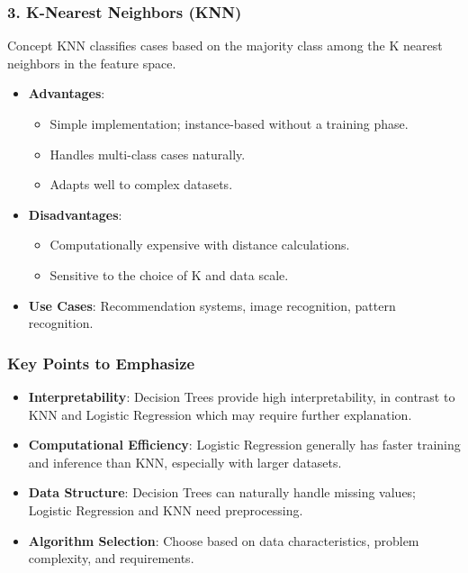 \documentclass[aspectratio=169]{beamer}
\begin{document}
\begin{frame}[fragile]
    \frametitle{3. K-Nearest Neighbors (KNN)}
    \begin{block}{Concept}
        KNN classifies cases based on the majority class among the K nearest neighbors in the feature space.
    \end{block}
    \begin{itemize}
        \item \textbf{Advantages}:
            \begin{itemize}
                \item Simple implementation; instance-based without a training phase.
                \item Handles multi-class cases naturally.
                \item Adapts well to complex datasets.
            \end{itemize}
        \item \textbf{Disadvantages}:
            \begin{itemize}
                \item Computationally expensive with distance calculations.
                \item Sensitive to the choice of K and data scale.
            \end{itemize}
        \item \textbf{Use Cases}: Recommendation systems, image recognition, pattern recognition.
    \end{itemize}
\end{frame}

\begin{frame}[fragile]
    \frametitle{Key Points to Emphasize}
    \begin{itemize}
        \item \textbf{Interpretability}: Decision Trees provide high interpretability, in contrast to KNN and Logistic Regression which may require further explanation.
        \item \textbf{Computational Efficiency}: Logistic Regression generally has faster training and inference than KNN, especially with larger datasets.
        \item \textbf{Data Structure}: Decision Trees can naturally handle missing values; Logistic Regression and KNN need preprocessing.
        \item \textbf{Algorithm Selection}: Choose based on data characteristics, problem complexity, and requirements.
    \end{itemize}
\end{frame}
\end{document}
